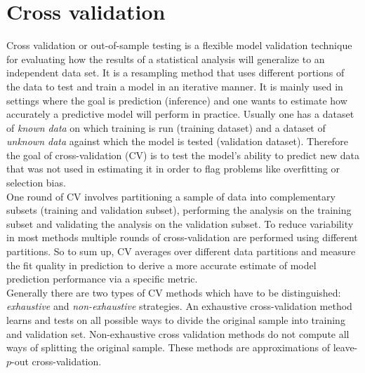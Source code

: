 \documentclass[12pt, a4paper]{article}
\begin{document}
\section{Cross validation}
\label{sec: cross_validation}
Cross validation or out-of-sample testing is a flexible model validation technique for evaluating how the results of a statistical analysis will generalize to an independent data set. It is a resampling method that uses different portions of the data to test and train a model in an iterative manner. It is mainly used in settings where the goal is prediction (inference) and one wants to estimate how accurately a predictive model will perform in practice. Usually one has a dataset of \textit{known data} on which training is run (training dataset) and a dataset of \textit{unknown data} against which the model is tested (validation dataset).
Therefore the goal of cross-validation (CV) is to test the model's ability to predict new data that was not used in estimating it in order to flag problems like overfitting or selection bias. \\
One round of CV involves partitioning a sample of data into complementary subsets (training and validation subset), performing the analysis on the training subset and validating the analysis on the validation subset. To reduce variability in most methods multiple rounds of cross-validation are performed using different partitions. So to sum up, CV averages over different data partitions and measure the fit quality in prediction to derive a more accurate estimate of model prediction performance via a specific metric. \\
Generally there are two types of CV methods which have to be distinguished: \textit{exhaustive} and \textit{non-exhaustive} strategies. An exhaustive cross-validation method learns and tests on all possible ways to divide the original sample into training and validation set. Non-exhaustive cross validation methods do not compute all ways of splitting the original sample. These methods are approximations of leave-$p$-out cross-validation.
\end{document}
